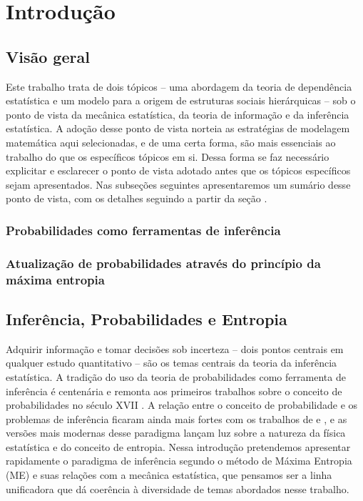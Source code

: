 \chapter{Introdução}

\section{Visão geral}
Este trabalho trata de dois tópicos -- uma abordagem da teoria de dependência estatística e um modelo para a origem de estruturas sociais hierárquicas -- sob o ponto de vista da mecânica estatística, da teoria de informação e da inferência estatística. A adoção desse ponto de vista norteia as estratégias de modelagem matemática aqui selecionadas, e de uma certa forma, são mais essenciais ao trabalho do que os específicos tópicos em si. Dessa forma se faz necessário explicitar e esclarecer o ponto de vista adotado antes que os tópicos específicos sejam apresentados. Nas subseções seguintes apresentaremos um sumário desse ponto de vista, com os detalhes seguindo a partir da seção \emph{}.

\subsection{Probabilidades como ferramentas de inferência}
\subsection{Atualização de probabilidades através do princípio da máxima entropia}

\section{Inferência, Probabilidades e Entropia}
\label{sec:inferencia}

Adquirir informação e tomar decisões sob incerteza -- dois pontos centrais em qualquer estudo quantitativo -- são os temas centrais da teoria da inferência estatística. A tradição do uso da teoria de probabilidades como ferramenta de inferência é centenária e remonta aos primeiros trabalhos sobre o conceito de probabilidades no século XVII \sourcesneeded. A relação entre o conceito de probabilidade e os problemas de inferência ficaram ainda mais fortes com os trabalhos de \citet{Cox1946}\cite[-6cm]{Cox1946,Cox1961} e \citet{Shannon1948}\cite[-3cm]{Shannon1948}, e as versões mais modernas desse paradigma\cite[-2cm]{Jaynes2003,ACaticha2008,ACaticha2009} lançam luz sobre a natureza da física estatística e do conceito de entropia. Nessa introdução pretendemos apresentar rapidamente o paradigma de inferência segundo o método de Máxima Entropia (ME) e suas relações com a mecânica estatística, que pensamos ser a linha unificadora que dá coerência à diversidade de temas abordados nesse trabalho. 

